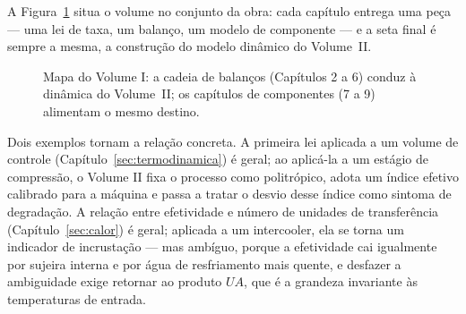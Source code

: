 \documentclass[12pt,a4paper]{article}
\numberwithin{equation}{section}
\numberwithin{table}{section}
\numberwithin{figure}{section}
\begin{document}
A Figura~\ref{fig:v1-c1-1} situa o volume no conjunto da obra: cada capítulo
entrega uma peça --- uma lei de taxa, um balanço, um modelo de componente ---
e a seta final é sempre a mesma, a construção do modelo dinâmico do
Volume~II.

\begin{figure}[H]
\centering
{}
\caption[Mapa do Volume I e sua ligação com o Volume II.]{Mapa do Volume I:
a cadeia de balanços (Capítulos 2 a 6) conduz à dinâmica do Volume~II; os
capítulos de componentes (7 a 9) alimentam o mesmo destino.}
\label{fig:v1-c1-1}
\end{figure}


Dois exemplos tornam a relação concreta. A primeira lei aplicada a um volume
de controle (Capítulo~\ref{sec:termodinamica}) é geral; ao aplicá-la a um
estágio de compressão, o Volume II fixa o processo como politrópico, adota um
índice efetivo calibrado para a máquina e passa a tratar o desvio desse índice
como sintoma de degradação. A relação entre efetividade e número de unidades
de transferência (Capítulo~\ref{sec:calor}) é geral; aplicada a um intercooler,
ela se torna um indicador de incrustação --- mas ambíguo, porque a efetividade
cai igualmente por sujeira interna e por água de resfriamento mais quente, e
desfazer a ambiguidade exige retornar ao produto $UA$, que é a grandeza
invariante às temperaturas de entrada.
\end{document}
